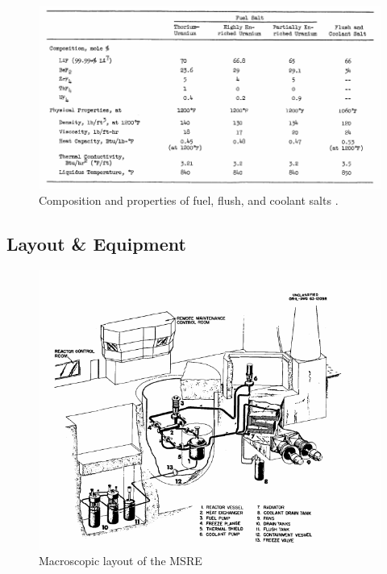 \documentclass{article}
\let\Oldsubsection\subsection
\renewcommand{\subsection}{\FloatBarrier\Oldsubsection}
\begin{document}
\begin{figure}[htpb]
  \centering
  \includegraphics[max height=.5\textheight,max width=\textwidth,keepaspectratio]{salt_properties.png}
  \caption{Composition and properties of fuel, flush, and coolant
    salts \cite{robertson_msre_1965}.}
  \label{fig:salt_properties}
\end{figure}

\subsection{Layout \& Equipment}

\begin{figure}[htpb]
  \centering
  \includegraphics[max height=.5\textheight,max width=\textwidth,keepaspectratio]{flow_diagram.png}
  \caption{Macroscopic layout of the \gls{MSRE} \cite{robertson_msre_1965}}
  \label{fig:MSRE_layout}
\end{figure}
\end{document}
